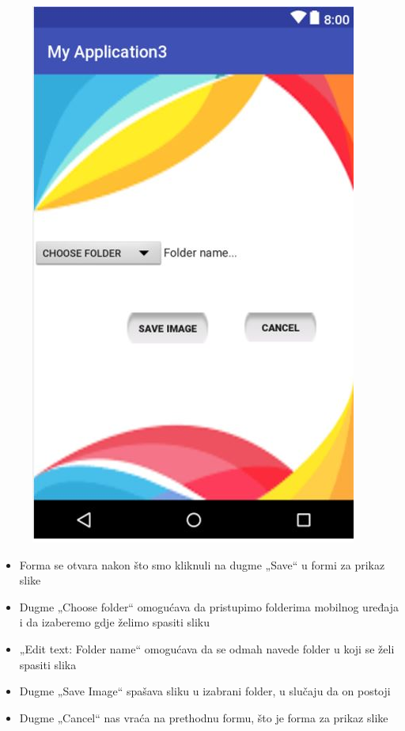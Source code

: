 \documentclass[12pt]{scrreprt}
\begin{document}
\begin{figure}[h]
	\begin{Center}
		\includegraphics{image8}
	\end{Center}
\end{figure}

\begin{itemize}
	\item	Forma se otvara nakon što smo kliknuli na dugme „Save“ u formi za prikaz slike
	\item	Dugme „Choose folder“ omogućava da pristupimo folderima mobilnog uređaja i da izaberemo gdje želimo spasiti sliku
	\item  „Edit text: Folder name“ omogućava da se odmah navede folder u koji se želi spasiti slika
	\item  Dugme „Save Image“ spašava sliku u izabrani folder, u slučaju da on postoji
	\item  Dugme „Cancel“ nas vraća na prethodnu formu, što je forma za prikaz slike
\end{itemize}
\break
\end{document}
